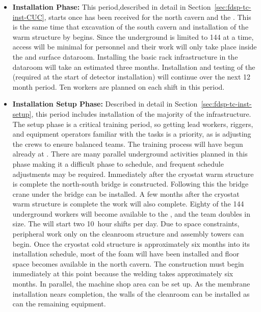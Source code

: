 \begin{itemize}

   \item {\bf {} Installation Phase:}
    This period,described in detail in Section~\ref{sec:fdsp-tc-inst-CUC}, starts once  has been received for the north cavern and the . This is the same time that excavation of the south cavern and installation of the warm structure by  begins. Since the  underground is limited to 144 at a time, access will be minimal for  personnel and their work will only take place inside the  and surface dataroom. Installing the basic rack infrastructure in the dataroom will take an estimated three months. Installation and testing of the  (required at the start of detector installation) will continue over the next 12 month period. Ten  workers are planned on each shift in this period.
     
 
   
    \item {\bf Installation Setup Phase:}  Described in detail in Section~\ref{sec:fdsp-tc-inst-setup}, this period includes installation of  the majority of the infrastructure. The setup phase is a critical training period, so getting lead workers, riggers, and equipment operators familiar with the tasks is a priority, as is  adjusting the crews to ensure balanced teams. The training process will have begun already at . 
    There are many parallel underground activities planned in this phase making it a difficult phase to schedule, and frequent schedule adjustments may be required. Immediately after the cryostat warm structure is complete the north-south bridge is constructed. Following this the bridge crane under the bridge can be installed. A few months after the cryostat warm structure is complete the  work will also complete. Eighty of the 144 underground workers will become available to the , and the  team doubles in size. The  will start two \SI{10}{hour} shifts per day.  Due to space constraints, peripheral work only on the cleanroom structure and assembly towers can begin. Once the  cryostat cold structure is approximately six months into its installation schedule, most of the foam will have been installed and floor space becomes available in the north cavern. The \coldbox construction must begin immediately at this point because the welding takes approximately six months. In parallel, the machine shop area can be set up. As the membrane installation nears completion, the walls of the cleanroom can be installed as can the remaining equipment. 
    

\end{itemize}

